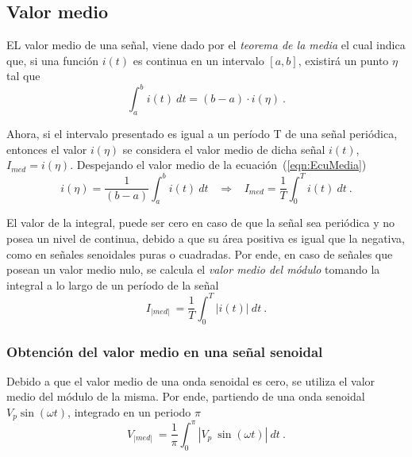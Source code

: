 \subsection{Valor medio}
    EL valor medio de una señal, viene dado por el 
    \textit{teorema de la media} el cual indica que, si una función \(i(t)\)
    es continua en un intervalo \([a,b]\), existirá un punto \(\eta\) 
    tal que
    \begin{equation}
        \int_{a}^{b} i(t)~dt = (b-a)\cdot i(\eta)~. \label{eqn:EcuMedia}
    \end{equation}

    \noindent Ahora, si el intervalo presentado es igual a un período T de una señal periódica,
    entonces el valor \(i(\eta)\) se considera el valor medio de dicha señal \(i(t)\), 
    \(I_{med} = i(\eta)\). Despejando el valor medio de la ecuación~(\ref{eqn:EcuMedia})
    \begin{equation*}
        i(\eta) = \dfrac{1}{(b-a)} \int_{a}^{b} i(t)~dt \hspace{10pt} \Longrightarrow \hspace{10pt}
        I_{med}= \dfrac{1}{T}\int_{0}^{T} i(t)~dt~.
    \end{equation*}

    El valor de la integral, puede ser cero en caso de que la señal sea periódica
    y no posea un nivel de continua, debido a que su área positiva es igual que la 
    negativa, como en señales senoidales puras o cuadradas. Por ende, en caso de 
    señales que posean un valor medio nulo, se calcula el \textit{valor medio del módulo} 
    tomando la integral a lo largo de un período de la señal
    \begin{equation*}
        I_{|med|} ~ = \dfrac{1}{T} \int_{0}^{T} |i(t)|~dt~.
    \end{equation*}

        \subsubsection{Obtención del valor medio en una señal senoidal}

            Debido a que el valor medio de una onda senoidal es cero, se utiliza el 
            valor medio del módulo de la misma. Por ende, partiendo de una onda senoidal
            \(V_p\sin(\omega t)\), integrado en un periodo \(\pi\)
            \begin{equation*}
                V_{|med|} ~ = \dfrac{1}{\pi} \int_{0}^{\pi} |V_p~\sin(\omega t)|~dt~.
            \end{equation*}

